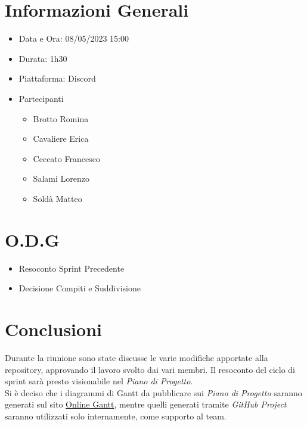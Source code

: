 \documentclass[a4paper, 12pt]{article}
\begin{document}
\makefrontpage

\section*{Informazioni Generali}
\begin{itemize}
    \item Data e Ora: 08/05/2023 15:00
    \item Durata: 1h30
    \item Piattaforma: Discord
    \item Partecipanti
    \begin{itemize}
        \item Brotto Romina
        \item Cavaliere Erica
        \item Ceccato Francesco
        \item Salami Lorenzo
        \item Soldà Matteo
    \end{itemize}
\end{itemize}

\section*{O.D.G}
\begin{itemize}
    \item Resoconto Sprint Precedente
    \item Decisione Compiti e Suddivisione
\end{itemize}

\section*{Conclusioni}
Durante la riunione sono state discusse le varie modifiche apportate alla repository, approvando il lavoro svolto dai vari membri. Il resoconto del ciclo di sprint sarà presto visionabile nel \textit{Piano di Progetto}.\\
Si è deciso che i diagrammi di Gantt da pubblicare sui \textit{Piano di Progetto} saranno generati sul sito \href{https://www.onlinegantt.com/}{Online Gantt}, mentre quelli generati tramite \textit{GitHub Project} saranno utilizzati solo internamente, come supporto al team.
\end{document}
